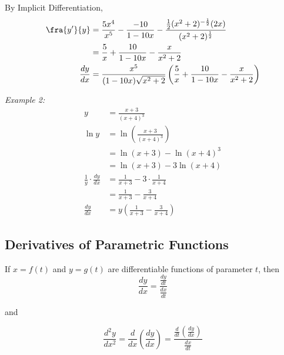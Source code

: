         \noindent By Implicit Differentiation, \\

        \begin{align*}
            \fra{y'}{y} &= \frac{5x^4}{x^5}- \frac{-10}{1-10x} - \frac{\frac{1}{2}(x^2+2)^{-\frac{1}{2}}(2x)}{(x^2+2)^{\frac{1}{2}}} \\
            &= \frac{5}{x} + \frac{10}{1-10x} - \frac{x}{x^2+2} \\
            \frac{dy}{dx} &= \frac{x^5}{(1-10x)\sqrt{x^2+2}}\left(\frac{5}{x}+\frac{10}{1-10x}-\frac{x}{x^2+2}\right)
        \end{align*}

        \noindent \color{blue} \textit{Example 2:} \color{black} \\

        \begin{align*}
            y &= \frac{x+3}{(x+4)^3} \\
            \ln{y} &= \ln{\left(\frac{x+3}{(x+4)^3}\right)} \\
            &= \ln{(x+3)} - \ln{(x+4)^3} \\
            &= \ln{(x+3)}  - 3\ln{(x+4)} \\
            \frac{1}{y}\cdot\frac{dy}{dx} &= \frac{1}{x+3}-3\cdot\frac{1}{x+4} \\
            &= \frac{1}{x+3}-\frac{3}{x+4} \\
            \frac{dy}{dx} &= y\left(\frac{1}{x+3}-\frac{3}{x+4}\right)
        \end{align*}


    \subsection{Derivatives of Parametric Functions}
        If $x=f(t)$ and $y=g(t)$ are differentiable functions of parameter $t$, then \\

        \begin{equation*}
            \frac{dy}{dx} = \frac{\frac{dy}{dt}}{\frac{dx}{dt}}
        \end{equation*}

        \noindent and

        \begin{equation*}
            \frac{d^2y}{dx^2} = \frac{d}{dx}\left(\frac{dy}{dx}\right)
            = \frac{\frac{d}{dt}\left(\frac{dy}{dx}\right)}{\frac{dx}{dt}}
        \end{equation*}

